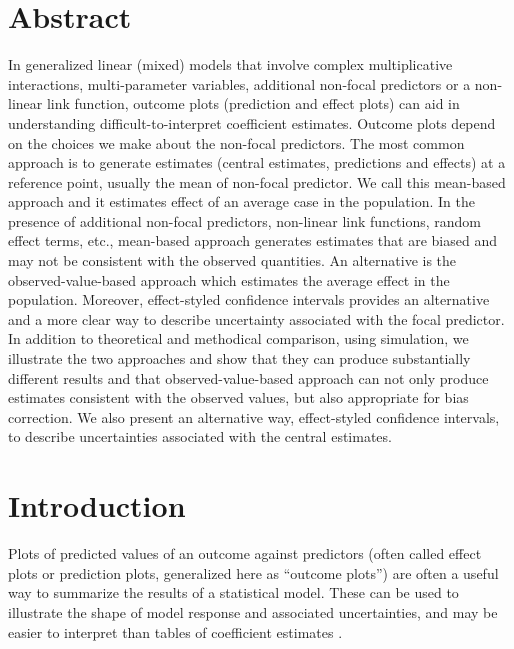 \section*{Abstract}

In generalized linear (mixed) models that involve complex multiplicative interactions, multi-parameter variables, additional non-focal predictors or a non-linear link function, outcome plots (prediction and effect plots) can aid in understanding difficult-to-interpret coefficient estimates. Outcome plots depend on the choices we make about the non-focal predictors.
The most common approach is to generate estimates (central estimates, predictions and effects) at a reference point, usually the mean of non-focal predictor. We call this mean-based approach and it estimates effect of an average case in the population. In the presence of additional non-focal predictors, non-linear link functions, random effect terms, etc., mean-based approach generates estimates that are biased and may not be consistent with the observed quantities. An alternative is the observed-value-based approach which estimates the average effect in the population. Moreover, effect-styled confidence intervals provides an alternative and a more clear way to describe uncertainty associated with the focal predictor. In addition to theoretical and methodical comparison, using simulation, we illustrate the two approaches and show that they can produce substantially different results and that observed-value-based approach can not only produce estimates consistent with the observed values, but also appropriate for bias correction. We also present an alternative way, effect-styled confidence intervals, to describe uncertainties associated with the central estimates.


\section{Introduction}

Plots of predicted values of an outcome against predictors (often called effect plots or prediction plots, generalized here as “outcome plots”) are often a useful way to summarize the results of a statistical model. These can be used to illustrate the shape of model response and associated uncertainties, and may be easier to interpret than tables of coefficient estimates \citep{searle_population_1980, brambor_understanding_2006, schielzeth2010simple, berry_improving_2012, leeper2017interpreting}. 

